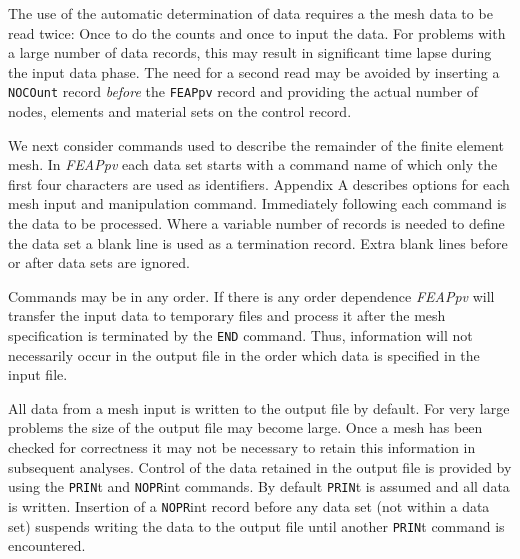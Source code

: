 The use of the automatic determination of data requires a the mesh data
to be read twice: Once to do the counts and once to input the data.
For problems with a large number of data records,
this may result in significant time lapse during the input data phase.
The need for a second read may be avoided by inserting a {\tt NOCOunt}
record {\it before} the {\tt FEAPpv} record and providing the actual number of
nodes, elements and material sets on the control record.

We next consider commands used to describe the remainder of the finite
element mesh.  In {\sl FEAPpv} each data set starts with a command name
of which only the first four characters are used as identifiers.
Appendix A describes options for each mesh input and manipulation command.
Immediately following each command is the data to be processed.  Where 
a variable number of records is needed to define the data set a blank
line is used as a termination record.  Extra blank lines before or after
data sets are ignored.

Commands may be in any order.  If there is any order dependence {\sl FEAPpv}
will transfer the input data to temporary files and process it after the
mesh specification is terminated by the {\tt END} command.  Thus, information
will not necessarily occur in the output file in the order which data is
specified in the input file.

All data from a mesh input is written to the output file by default.  For very
large problems the size of the output file may become large.  Once a mesh
has been checked for correctness it may not be necessary to retain this
information in subsequent analyses.  Control of the data retained in the
output file is provided by using the {\tt PRIN}t and {\tt NOPR}int commands.
By default {\tt PRIN}t is assumed and all data is written.  Insertion of a
{\tt NOPR}int record before any data set (not within a data set) suspends
writing the data to the output file until another {\tt PRIN}t command is
encountered.
